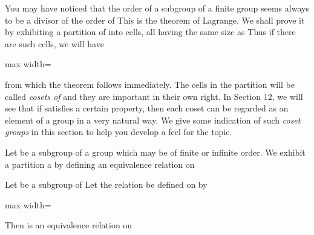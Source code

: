 \documentclass[11pt,oneside]{article}
\begin{document}
\fi
\renewcommand{\BookFooter}{Section 10 Cosets and the Theorem of Lagrange}
\ifdefined\BookMaster\else\setcounter{page}{97}\fi
\BookNarrativetrue

\begin{BookBody}


\noindent You may have noticed that the order of a subgroup  of a finite group  seems always to be a divisor of the order of  This is the theorem of Lagrange. We shall prove it by exhibiting a partition of  into cells, all having the same size as  Thus if there are  such cells, we will have

\begin{center}\begin{adjustbox}{max width=\linewidth}\end{adjustbox}\end{center}

\noindent from which the theorem follows immediately. The cells in the partition will be called \textit{cosets of}  and they are important in their own right. In Section 12, we will see that if  satisfies a certain property, then each coset can be regarded as an element of a group in a very natural way. We give some indication of such\textit{ coset groups} in this section to help you develop a feel for the topic.


\noindent Let  be a subgroup of a group  which may be of finite or infinite order. We exhibit a partition a  by defining an equivalence relation on 

 Let  be a subgroup of  Let the relation  be defined on  by

\begin{center}\begin{adjustbox}{max width=\linewidth}\end{adjustbox}\end{center}

\noindent Then \BookInline{\sim } is an equivalence relation on 

\end{BookBody}
\end{document}
